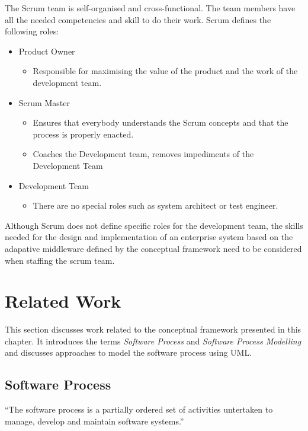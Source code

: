 The Scrum team is self-organised and cross-functional. The team members have all the needed competencies and skill to do their work.
Scrum defines the following roles:
\begin{itemize}
	\item Product Owner
	\begin{itemize}
		\item Responsible for maximising the value of the product and the work of the development team.
	\end{itemize}
	\item Scrum Master
	\begin{itemize}
		\item Ensures that everybody understands the Scrum concepts and that the process is properly enacted.
		\item Coaches the Development team, removes impediments of the Development Team
	\end{itemize}
	\item Development Team
	\begin{itemize}
		\item There are no special roles such as system architect or test engineer.
	\end{itemize}
\end{itemize}

Although Scrum does not define specific roles for the development team, the skills needed for the design and implementation of an enterprise system based on the adapative middleware defined by the conceptual framework need to be considered when staffing the scrum team. 


\section{Related Work}
\label{sec:ch6_related_work}

This section discusses work related to the conceptual framework presented in this chapter. It introduces the terms \emph{Software Process} and \emph{Software Process Modelling} and discusses approaches to model the software process using \ac{UML}.  

\subsection{Software Process}

``The software process is a partially ordered set of activities untertaken to manage, develop and maintain software systems.'' \citep{Acuna:2001aa}

